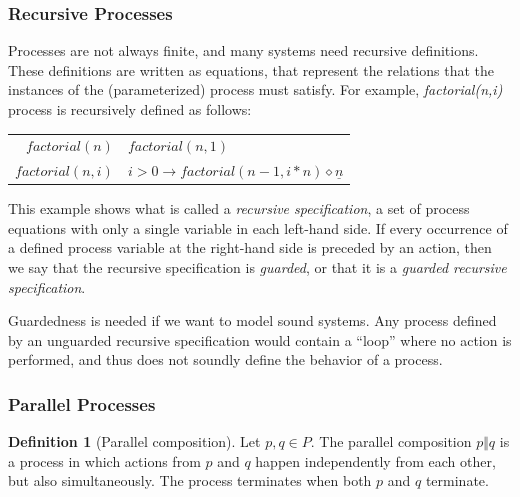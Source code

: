 \documentclass[11pt]{article}
\theoremstyle{definition}
\newtheorem{definition}{Definition}
\theoremstyle{plain}
\theoremstyle{definition}
\begin{document}
\subsubsection{Recursive Processes}
Processes are not always finite, and many systems need recursive definitions. These definitions are written as equations, that represent the relations that the instances of the (parameterized) process must satisfy. For example, \textit{factorial(n,i)} process is recursively defined as follows:
\begin{table}[H]
	\centering
	\begin{tabular}{  r@{ = }l  }
		$ factorial(n) $ & $ factorial(n,1) $ \\
		$ factorial(n,i) $ & $ i > 0 \rightarrow factorial(n-1,i*n) \diamond \underline{n} $
	\end{tabular}
\end{table}

This example shows what is called a \textit{recursive specification}, a set of process equations with only a single variable in each left-hand side. If every occurrence of a defined process variable at the right-hand side is preceded by an action, then we say that the recursive specification is \textit{guarded}, or that it is a \textit{guarded recursive specification}.

Guardedness is needed if we want to model sound systems. Any process defined by an unguarded recursive specification would contain a ``loop'' where no action is performed, and thus does not soundly define the behavior of a process.


\subsubsection{Parallel Processes}
\begin{definition} [Parallel composition]
	Let $ p, q \in P $. The parallel composition $ p \Vert q $ is a process in which actions from $ p $ and $ q $ happen independently from each other, but also simultaneously. The process terminates when both $ p $ and $ q $ terminate.
\end{definition}
\end{document}
